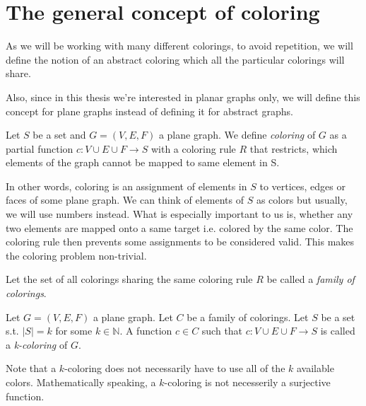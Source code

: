\section{The general concept of coloring}

As we will be working with many different colorings, to avoid repetition, we will define the notion of an abstract coloring which all the particular colorings will share. \begin{highlight} Also, since in this thesis we're interested in planar graphs only, we will define this concept for plane graphs instead of defining it for abstract graphs.

\begin{definition}
    Let $S$ be a set and $G=(V,E,F)$ a plane graph. We define \textit{coloring} of $G$ as a partial function $c: V \cup E \cup F \rightarrow S$ with a coloring rule $R$ that restricts, which elements of the graph cannot be mapped to same element in S.
\end{definition}



In other words, coloring is an assignment of elements in $S$ to vertices, edges or faces of some plane graph. We can think of elements of $S$ as colors but usually, we will use numbers instead. What is especially important to us is, whether any two elements are mapped onto a same target i.e. colored by the same color. The coloring rule then prevents some assignments to be considered valid. This makes the coloring problem non-trivial.
\end{highlight}

\begin{definition}
    Let the set of all colorings sharing the same coloring rule $R$ be called a \textit{family of colorings}.
\end{definition}

\begin{highlight}
    
\begin{definition}
    Let $G=(V,E,F)$ a plane graph. Let $C$ be a family of colorings. Let $S$ be a set s.t. $|S| = k$ for some $k \in \mathbb{N}$. A function $c \in C$ such that $c: V \cup E \cup F \rightarrow S$ is called a \textit{k-coloring} of $G$.
\end{definition}
\end{highlight}
Note that a $k$-coloring does not necessarily have to use all of the $k$ available colors. Mathematically speaking, a $k$-coloring is not necesserily a surjective function.


